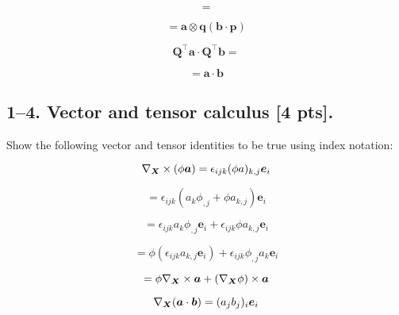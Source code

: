 \documentclass[preprint,12pt,authoryear]{elsarticle}
\begin{document}
\begin{equation*}
    = 
\end{equation*}


\begin{equation*}
    = \bm{a}\otimes\bm{q}(\bm{b} \cdot \bm{p})
\end{equation*}

\newpage


\begin{equation*}
    \bm{Q}^\intercal \bm{a} \cdot \bm{Q}^\intercal \bm{b} = 
\end{equation*}


\begin{equation*}
    = \bm{a} \cdot \bm{b}
\end{equation*}

\newpage


\subsection*{1--4. \textbf{Vector and tensor calculus} [4 pts].} Show the following vector and tensor identities to be true using index notation:

\begin{equation*}
    \nabla_{\bm{X}} \times (\phi \bm{a}) = \epsilon_{ijk} (\phi a)_{k,j} \bm{e}_{i}
\end{equation*}

\begin{equation*}
    = \epsilon_{ijk}(a_k \phi_{,j} + \phi a_{k,j})\bm{e}_{i}
\end{equation*}

\begin{equation*}
    = \epsilon_{ijk} a_k \phi_{,j} \bm{e}_{i} + \epsilon_{ijk} \phi a_{k,j} \bm{e}_{i}
\end{equation*}

\begin{equation*}
    = \phi(\epsilon_{ijk}  a_{k,j} \bm{e}_{i}) + \epsilon_{ijk} \phi_{,j} a_k \bm{e}_{i}
\end{equation*}

\begin{equation*}
    = \phi \nabla_{\bm{X}} \times \bm{a} + (\nabla_{\bm{X}}\phi) \times \bm{a}
\end{equation*}

\newpage


\begin{equation*}
    \nabla_{\bm{X}} (\bm{a} \cdot \bm{b}) = (a_j b_j)_i \bm{e}_i
\end{equation*}
\end{document}
